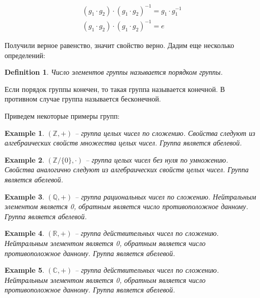 \documentclass[10pt,a4paper]{article}
\newtheorem{defin}{Definition}
\newtheorem{exmpl}{Example}
\begin{document}
			\begin{align}
				\left(g_{1}\cdot g_{2}\right)\cdot 
				\left(g_{1}\cdot g_{2}\right)^{-1} = 
				g_{1}\cdot g_{1}^{-1}\\
				\left(g_{1}\cdot g_{2}\right)\cdot 
				\left(g_{1}\cdot g_{2}\right)^{-1} = 
				e
			\end{align}			 
			
			Получили верное равенство, значит свойство верно.				 
		Дадим еще несколько определений:
		
		\begin{defin}		
			Число элементов группы называется порядком группы.
		\end{defin}
		
		Если порядок группы конечен, то такая группа называется конечной.
		В противном случае группа называется бесконечной.
			
		Приведем некоторые примеры групп:
		
		\begin{exmpl}
			$\left(\mathbb{Z}, +\right)$ -- группа целых чисел по сложению. 
			Свойства следуют из алгебраических свойств множества целых чисел.
			Группа является абелевой.
		\end{exmpl}
		
		\begin{exmpl}
			$\left(\mathbb{Z}/\lbrace 0\rbrace, \cdot \right)$ -- группа целых 
			чисел без нуля по умножению. Свойства аналогично следуют из 
			алгебраических свойств целых чисел. Группа является абелевой.
		\end{exmpl}
		
		\begin{exmpl}
			$\left(\mathbb{Q}, +\right)$ -- группа рациональных чисел по 
			сложению. Нейтральным элементом является 0, обратным является
			число противоположное данному. Группа является абелевой.
		\end{exmpl}
		
		\begin{exmpl}
			$\left(\mathbb{R}, +\right)$ -- группа действительных чисел по 
			сложению. Нейтральным элементом является 0, обратным является
			число противоположное данному. Группа является абелевой.
		\end{exmpl}
		
		\begin{exmpl}
			$\left(\mathbb{C, +}\right)$ -- группа действительных чисел по 
			сложению. Нейтральным элементом является 0, обратным является
			число противоположное данному. Группа является абелевой.
		\end{exmpl}
		
\end{document}
